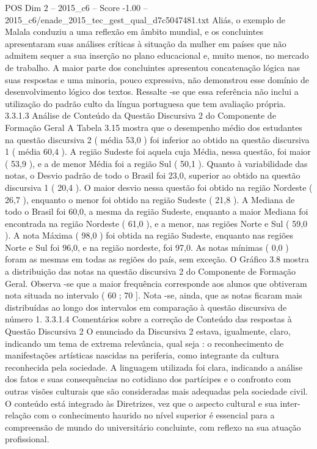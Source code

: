 \begin{textsample}{POS Dim 2 – 2015\_c6 – Score -1.00 – 2015\_c6/enade\_2015\_tec\_gest\_qual\_d7c5047481.txt}
Aliás, o exemplo de Malala conduziu a uma reflexão em âmbito mundial, e os concluintes apresentaram suas análises críticas à situação da mulher em países que não admitem sequer a sua inserção no plano educacional e, muito menos, no mercado de trabalho.
A maior parte dos concluintes apresentou concatenação lógica nas suas respostas e uma minoria, pouco expressiva, não demonstrou esse domínio de desenvolvimento lógico dos textos.
Ressalte -se que essa referência não inclui a utilização do padrão culto da língua portuguesa que tem avaliação própria. 3.3.1.3 Análise de Conteúdo da Questão Discursiva 2 do Componente de Formação Geral A Tabela 3.15 mostra que o desempenho médio dos estudantes na questão discursiva 2 ( média 53,0 ) foi inferior ao obtido na questão discursiva 1 ( média 60,4 ).
A região Sudeste foi aquela cuja Média, nessa questão, foi maior ( 53,9 ), e a de menor Média foi a região Sul ( 50,1 ).
Quanto à variabilidade das notas, o Desvio padrão de todo o Brasil foi 23,0, superior ao obtido na questão discursiva 1 ( 20,4 ).
O maior desvio nessa questão foi obtido na região Nordeste ( 26,7 ), enquanto o menor foi obtido na região Sudeste ( 21,8 ).
A Mediana de todo o Brasil foi 60,0, a mesma da região Sudeste, enquanto a maior Mediana foi encontrada na região Nordeste ( 61,0 ), e a menor, nas regiões Norte e Sul ( 59,0 ).
A nota Máxima ( 98,0 ) foi obtida na região Sudeste, enquanto nas regiões Norte e Sul foi 96,0, e na região nordeste, foi 97,0.
As notas mínimas ( 0,0 ) foram as mesmas em todas as regiões do país, sem exceção.
O Gráfico 3.8 mostra a distribuição das notas na questão discursiva 2 do Componente de Formação Geral.
Observa -se que a maior frequência corresponde aos alunos que obtiveram nota situada no intervalo ( 60 ; 70 ].
Nota -se, ainda, que as notas ficaram mais distribuídas ao longo dos intervalos em comparação à questão discursiva de número 1. 3.3.1.4 Comentários sobre a correção de Conteúdo das respostas à Questão Discursiva 2 O enunciado da Discursiva 2 estava, igualmente, claro, indicando um tema de extrema relevância, qual seja : o reconhecimento de manifestações artísticas nascidas na periferia, como integrante da cultura reconhecida pela sociedade.
A linguagem utilizada foi clara, indicando a análise dos fatos e suas consequências no cotidiano dos partícipes e o confronto com outras visões culturais que são consideradas mais adequadas pela sociedade civil.
O conteúdo está integrado às Diretrizes, vez que o aspecto cultural e sua inter-relação com o conhecimento haurido no nível superior é essencial para a compreensão de mundo do universitário concluinte, com reflexo na sua atuação profissional.

\end{textsample}
